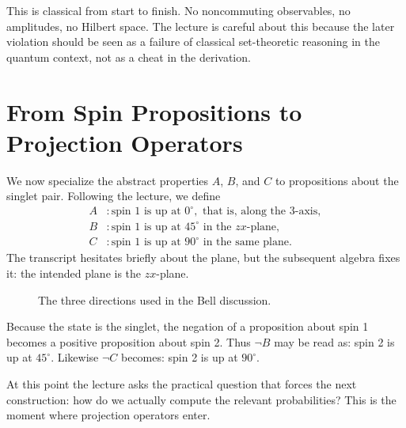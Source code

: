 This is classical from start to finish. No noncommuting observables, no amplitudes, no Hilbert space. The lecture is careful about this because the later violation should be seen as a failure of classical set-theoretic reasoning in the quantum context, not as a cheat in the derivation.

\section{From Spin Propositions to Projection Operators}

We now specialize the abstract properties \(A\), \(B\), and \(C\) to propositions about the singlet pair. Following the lecture, we define
\begin{align}
A &: \text{spin 1 is up at }0^\circ, \text{ that is, along the }3\text{-axis}, \\
B &: \text{spin 1 is up at }45^\circ \text{ in the }zx\text{-plane}, \\
C &: \text{spin 1 is up at }90^\circ \text{ in the same plane}.
\end{align}
The transcript hesitates briefly about the plane, but the subsequent algebra fixes it: the intended plane is the \(zx\)-plane.

\begin{figure}[h]
\centering
{}
\caption{The three directions used in the Bell discussion.}
\end{figure}

Because the state is the singlet, the negation of a proposition about spin 1 becomes a positive proposition about spin 2. Thus \(\neg B\) may be read as: spin 2 is up at \(45^\circ\). Likewise \(\neg C\) becomes: spin 2 is up at \(90^\circ\).

At this point the lecture asks the practical question that forces the next construction: how do we actually compute the relevant probabilities? This is the moment where projection operators enter.

